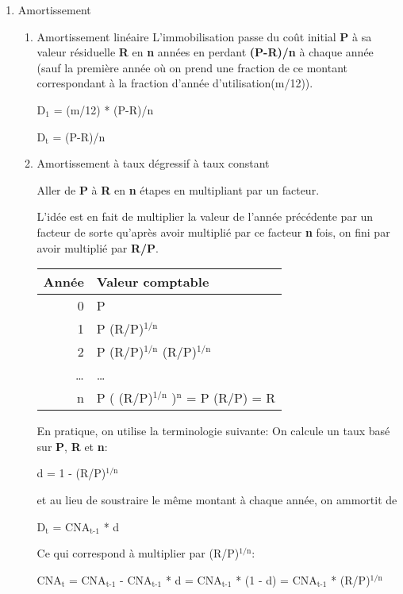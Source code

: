 \documentclass[11pt]{article}
\begin{document}
\begin{enumerate}
\item Amortissement
\label{sec:org7b83484}
\begin{enumerate}
\item Amortissement linéaire
\label{sec:orgca2418b}
L'immobilisation passe du coût initial \textbf{P} à sa valeur résiduelle \textbf{R} en \textbf{n}
années en perdant \textbf{(P-R)/n} à chaque année (sauf la première année où on prend
une fraction de ce montant correspondant à la fraction d'année d'utilisation(m/12)).

D\(_{\text{1}}\) = (m/12) * (P-R)/n

D\(_{\text{t}}\) = (P-R)/n

\item Amortissement à taux dégressif à taux constant
\label{sec:orge8842d7}

Aller de \textbf{P} à \textbf{R} en \textbf{n} étapes en multipliant par un facteur.

L'idée est en fait de multiplier la valeur de l'année précédente par un facteur
de sorte qu'après avoir multiplié par ce facteur \textbf{n} fois, on fini par avoir
multiplié par \textbf{R/P}.

\begin{center}
\begin{tabular}{rl}
Année & Valeur comptable\\
\hline
0 & P\\
1 & P (R/P)\(^{\text{1/n}}\)\\
2 & P (R/P)\(^{\text{1/n}}\) (R/P)\(^{\text{1/n}}\)\\
\dots{} & \dots{}\\
n & P ( (R/P)\(^{\text{1/n}}\) )\(^{\text{n}}\) = P (R/P) = R\\
\end{tabular}
\end{center}


En pratique, on utilise la terminologie suivante:
On calcule un taux basé sur \textbf{P}, \textbf{R} et \textbf{n}:

d = 1 - (R/P)\(^{\text{1/n}}\)

et au lieu de soustraire le même montant à chaque année, on ammortit de

D\(_{\text{t}}\) = CNA\(_{\text{t-1}}\) * d

Ce qui correspond à multiplier par (R/P)\(^{\text{1/n}}\):

CNA\(_{\text{t}}\) = CNA\(_{\text{t-1}}\) - CNA\(_{\text{t-1}}\) * d = CNA\(_{\text{t-1}}\) * (1 - d) = CNA\(_{\text{t-1}}\) * (R/P)\(^{\text{1/n}}\)


\end{enumerate}
\end{enumerate}
\end{document}

